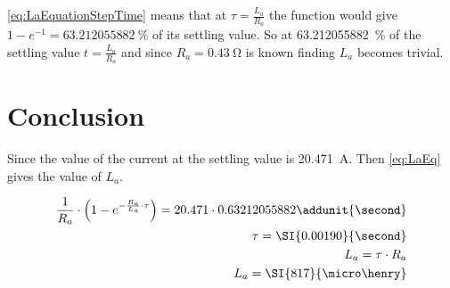 \autoref{eq:LaEquationStepTime} means that at $\tau=\frac{L_a}{R_a}$ the function would give $1-e^{-1}=\SI{63.212055882}{\percent}$ of its settling value. So at \SI{63.212055882}{\percent} of the settling value $t=\frac{L_a}{R_a}$ and since $R_a=\SI{0.43}{\ohm}$ is known finding $L_a$ becomes trivial.

\section*{Conclusion}

Since the value of the current at the settling value is \SI{20.471}{\ampere}. Then \autoref{eq:LaEq} gives the value of $L_a$.

\begin{subequations} \label{eq:LaEq}
	\begin{align}
	\frac{1}{R_a}\cdot \left(1-e^{-\frac{R_a}{L_a}\cdot \tau}\right)=20.471\cdot 0.63212055882 \addunit{\second} \\
	\tau = \SI{0.00190}{\second} \\
	L_a=\tau \cdot R_a \\
	L_a=\SI{817}{\micro\henry}
	\end{align}
\end{subequations}
